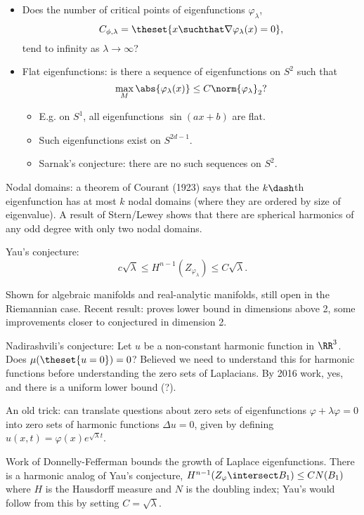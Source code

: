 \begin{itemize}
\item
  Does the number of critical points of eigenfunctions
  \(\varphi_\lambda\), \[
  C_{\phi, \lambda} = \theset{x \suchthat \nabla \varphi_\lambda(x)= 0},
  \] tend to infinity as \(\lambda \to \infty\)?
\item
  Flat eigenfunctions: is there a sequence of eigenfunctions on \(S^2\)
  such that \[
  \max_M \abs{\varphi_\lambda(x)} \leq C \norm{\varphi_\lambda}_2?
  \]

  \begin{itemize}
  \tightlist
  \item
    E.g. on \(S^1\), all eigenfunctions \(\sin(ax+b)\) are flat.
  \item
    Such eigenfunctions exist on \(S^{2d-1}\).
  \item
    Sarnak's conjecture: there are no such sequences on \(S^2\).
  \end{itemize}
\end{itemize}

Nodal domains: a theorem of Courant (1923) says that the \(k\dash\)th
eigenfunction has at most \(k\) nodal domains (where they are ordered by
size of eigenvalue). A result of Stern/Lewey shows that there are
spherical harmonics of any odd degree with only two nodal domains.

Yau's conjecture: \[
c\sqrt\lambda \leq H^{n-1}(Z_{\varphi_\lambda}) \leq C \sqrt \lambda.
\]

Shown for algebraic manifolds and real-analytic manifolds, still open in
the Riemannian case. Recent result: proves lower bound in dimensions
above 2, some improvements closer to conjectured in dimension 2.

Nadirashvili's conjecture: Let \(u\) be a non-constant harmonic function
in \(\RR^3\). Does \(\mu(\theset{u=0}) = 0\)? Believed we need to
understand this for harmonic functions before understanding the zero
sets of Laplacians. By 2016 work, yes, and there is a uniform lower
bound (?).

An old trick: can translate questions about zero sets of eigenfunctions
\(\varphi + \lambda \varphi = 0\) into zero sets of harmonic functions
\(\Delta u = 0\), given by defining
\(u(x,t) = \varphi(x)e^{\sqrt\lambda t}\).

Work of Donnelly-Fefferman bounds the growth of Laplace eigenfunctions.
There is a harmonic analog of Yau's conjecture,
\(H^{n-1}(Z_\varphi \intersect B_1) \leq CN(B_1)\) where \(H\) is the
Hausdorff measure and \(N\) is the doubling index; Yau's would follow
from this by setting \(C=\sqrt\lambda\).

